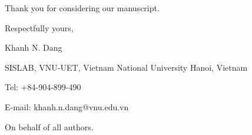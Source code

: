 \documentclass[12pt]{article}
\begin{document}
\begin{sf}
\vspace{.3cm}
\noindent
Thank you for considering our manuscript. 

\vspace{.5cm}


\noindent 
Respectfully yours, 

\vspace{.1cm}
\noindent
Khanh N. Dang 

\vspace{.2cm}



\noindent
SISLAB, VNU-UET, Vietnam National University Hanoi, Vietnam

\noindent
Tel: +84-904-899-490 

\noindent
E-mail:   khanh.n.dang@vnu.edu.vn 

\vspace{.3cm}
\noindent
On behalf of all authors.
\pagebreak
\end{sf}
\end{document}
